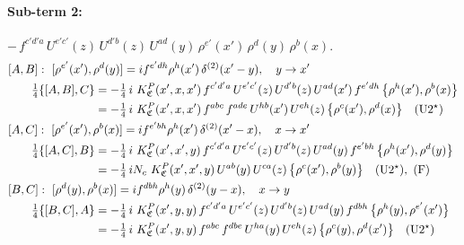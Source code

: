 \documentclass[10pt]{article}
\numberwithin{equation}{section}
\begin{document}
\paragraph{Sub-term 2:} $-\,f^{c'd'a}\,U^{e'c'}(z)\,U^{d'b}(z)\,U^{ad}(y)\,\rho^{e'}(x')\,\rho^{d}(y)\,\rho^{b}(x)$.
\begin{align}
&[A,B]:\ [\rho^{e'}(x'),\rho^{d}(y)]=i f^{e'dh}\rho^{h}(x')\,\delta^{(2)}(x'-y),\quad y\to x'\notag\\
&\qquad \tfrac14\{[A,B],C\}=-\tfrac14\,i\,\,K^{P}_{\mathfrak C}(x',x,x')\,f^{c'd'a}\,U^{e'c'}(z)\,U^{d'b}(z)\,U^{ad}(x')\,f^{e'dh}\,\big\{\rho^{h}(x'),\rho^{b}(x)\big\}\notag\\
&\qquad\phantom{\tfrac14\{[A,B],C\}}=-\tfrac14\,i\,\,K^{P}_{\mathfrak C}(x',x,x')\,f^{abc}\,f^{ade}\,U^{hb}(x')\,U^{eh}(z)\,\big\{\rho^{c}(x'),\rho^{d}(x)\big\}\quad\text{(U2$^\star$)}
\label{eq:GIII.VI.P-2-AB}\\
&[A,C]:\ [\rho^{e'}(x'),\rho^{b}(x)]=i f^{e'bh}\rho^{h}(x')\,\delta^{(2)}(x'-x),\quad x\to x'\notag\\
&\qquad \tfrac14\{[A,C],B\}=-\tfrac14\,i\,\,K^{P}_{\mathfrak C}(x',x',y)\,f^{c'd'a}\,U^{e'c'}(z)\,U^{d'b}(z)\,U^{ad}(y)\,f^{e'bh}\,\big\{\rho^{h}(x'),\rho^{d}(y)\big\}\notag\\
&\qquad\phantom{\tfrac14\{[A,C],B\}}=-\tfrac14\,i N_{c}\,\,K^{P}_{\mathfrak C}(x',x',y)\,U^{ab}(y)\,U^{ca}(z)\,\big\{\rho^{c}(x'),\rho^{b}(y)\big\}\quad\text{(U2$^\star$)},\ \text{(F)}
\label{eq:GIII.VI.P-2-AC}\\
&[B,C]:\ [\rho^{d}(y),\rho^{b}(x)]=i f^{dbh}\rho^{h}(y)\,\delta^{(2)}(y-x),\quad x\to y\notag\\
&\qquad \tfrac14\{[B,C],A\}=-\tfrac14\,i\,\,K^{P}_{\mathfrak C}(x',y,y)\,f^{c'd'a}\,U^{e'c'}(z)\,U^{d'b}(z)\,U^{ad}(y)\,f^{dbh}\,\big\{\rho^{h}(y),\rho^{e'}(x')\big\}\notag\\
&\qquad\phantom{\tfrac14\{[B,C],A\}}=-\tfrac14\,i\,\,K^{P}_{\mathfrak C}(x',y,y)\,f^{abc}\,f^{dbe}\,U^{ha}(y)\,U^{eh}(z)\,\big\{\rho^{c}(y),\rho^{d}(x')\big\}\quad\text{(U2$^\star$)}
\label{eq:GIII.VI.P-2-BC}
\end{align}
\end{document}
